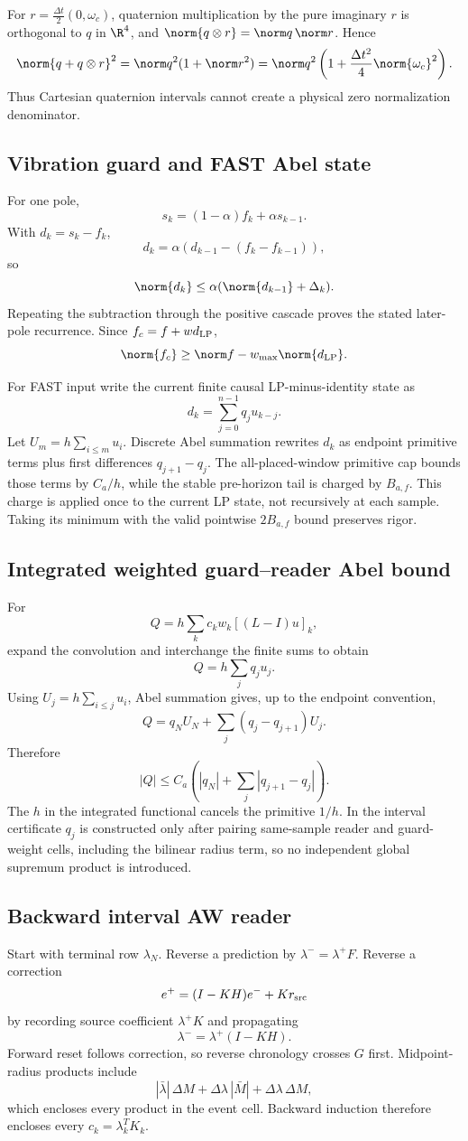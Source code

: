 For \(r=\frac{\Delta t}{2}(0,\omega_c)\), quaternion multiplication by the pure imaginary \(r\) is orthogonal to \(q\) in \(\R^4\), and
\(\norm{q\otimes r}=\norm q\,\norm r\). Hence
\[
\norm{q+q\otimes r}^2
=\norm q^2(1+\norm r^2)
=\norm q^2\left(1+\frac{\Delta t^2}{4}\norm{\omega_c}^2\right).
\]
Thus Cartesian quaternion intervals cannot create a physical zero normalization denominator.

\subsection{Vibration guard and FAST Abel state}
For one pole,
\[
s_k=(1-\alpha)f_k+\alpha s_{k-1}.
\]
With \(d_k=s_k-f_k\),
\[
d_k=\alpha(d_{k-1}-(f_k-f_{k-1})),
\]
so
\[
\norm{d_k}\le\alpha(\norm{d_{k-1}}+\Delta_k).
\]
Repeating the subtraction through the positive cascade proves the stated later-pole recurrence. Since \(f_c=f+w d_{\rm LP}\),
\[
\norm{f_c}\ge\norm f-w_{\max}\norm{d_{\rm LP}}.
\]

For FAST input write the current finite causal LP-minus-identity state as
\[
d_k=\sum_{j=0}^{n-1}q_j u_{k-j}.
\]
Let \(U_m=h\sum_{i\le m}u_i\). Discrete Abel summation rewrites \(d_k\) as endpoint primitive terms plus first differences \(q_{j+1}-q_j\). The all-placed-window primitive cap bounds those terms by \(C_a/h\), while the stable pre-horizon tail is charged by \(B_{a,f}\). This charge is applied once to the current LP state, not recursively at each sample. Taking its minimum with the valid pointwise \(2B_{a,f}\) bound preserves rigor.

\subsection{Integrated weighted guard--reader Abel bound}
For
\[
Q=h\sum_k c_kw_k[(L-I)u]_k,
\]
expand the convolution and interchange the finite sums to obtain
\[
Q=h\sum_j q_j u_j.
\]
Using \(U_j=h\sum_{i\le j}u_i\), Abel summation gives, up to the endpoint convention,
\[
Q=q_NU_N+\sum_j(q_j-q_{j+1})U_j.
\]
Therefore
\[
|Q|\le C_a\left(|q_N|+\sum_j|q_{j+1}-q_j|\right).
\]
The \(h\) in the integrated functional cancels the primitive \(1/h\). In the interval certificate \(q_j\) is constructed only after pairing same-sample reader and guard-weight cells, including the bilinear radius term, so no independent global supremum product is introduced.

\subsection{Backward interval AW reader}
Start with terminal row \(\lambda_N\). Reverse a prediction by
\(\lambda^-=\lambda^+F\). Reverse a correction
\[
e^+=(I-KH)e^-+Kr_{\rm src}
\]
by recording source coefficient \(\lambda^+K\) and propagating
\[
\lambda^-=\lambda^+(I-KH).
\]
Forward reset follows correction, so reverse chronology crosses \(G\) first. Midpoint-radius products include
\[
|\bar\lambda|\,\Delta M+\Delta\lambda\,|\bar M|
+\Delta\lambda\,\Delta M,
\]
which encloses every product in the event cell. Backward induction therefore encloses every \(c_k=\lambda_k^TK_k\).

